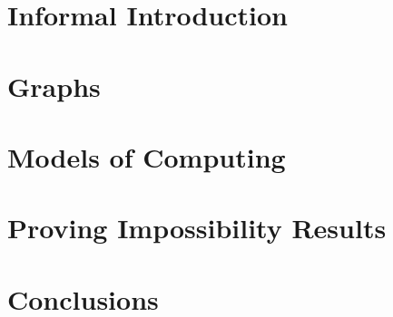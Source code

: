 


\frontmatter
\maketitle
\tableofcontents



\mainmatter
\part{Informal Introduction}




\part{Graphs}



\part{Models of Computing}







\part{Proving Impossibility Results}







\part{Conclusions}



\backmatter

\printendnotes[custom]

\clearpage
{}
{}

{\def\UrlFont{\small\color{titlecolor}}
}


